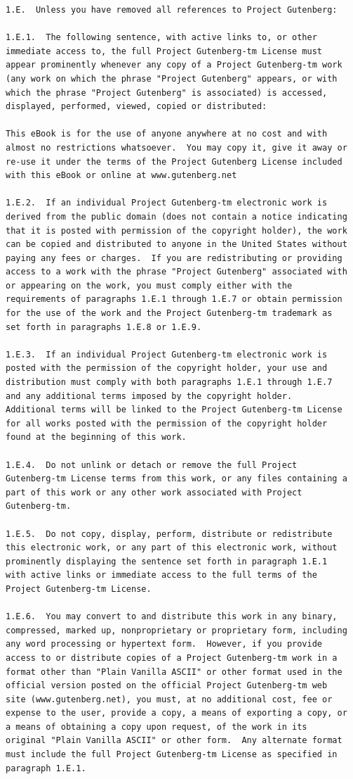 \documentclass[oneside]{book}
\begin{document}
\begin{verbatim}
1.E.  Unless you have removed all references to Project Gutenberg:

1.E.1.  The following sentence, with active links to, or other
immediate access to, the full Project Gutenberg-tm License must
appear prominently whenever any copy of a Project Gutenberg-tm work
(any work on which the phrase "Project Gutenberg" appears, or with
which the phrase "Project Gutenberg" is associated) is accessed,
displayed, performed, viewed, copied or distributed:

This eBook is for the use of anyone anywhere at no cost and with
almost no restrictions whatsoever.  You may copy it, give it away or
re-use it under the terms of the Project Gutenberg License included
with this eBook or online at www.gutenberg.net

1.E.2.  If an individual Project Gutenberg-tm electronic work is
derived from the public domain (does not contain a notice indicating
that it is posted with permission of the copyright holder), the work
can be copied and distributed to anyone in the United States without
paying any fees or charges.  If you are redistributing or providing
access to a work with the phrase "Project Gutenberg" associated with
or appearing on the work, you must comply either with the
requirements of paragraphs 1.E.1 through 1.E.7 or obtain permission
for the use of the work and the Project Gutenberg-tm trademark as
set forth in paragraphs 1.E.8 or 1.E.9.

1.E.3.  If an individual Project Gutenberg-tm electronic work is
posted with the permission of the copyright holder, your use and
distribution must comply with both paragraphs 1.E.1 through 1.E.7
and any additional terms imposed by the copyright holder.
Additional terms will be linked to the Project Gutenberg-tm License
for all works posted with the permission of the copyright holder
found at the beginning of this work.

1.E.4.  Do not unlink or detach or remove the full Project
Gutenberg-tm License terms from this work, or any files containing a
part of this work or any other work associated with Project
Gutenberg-tm.

1.E.5.  Do not copy, display, perform, distribute or redistribute
this electronic work, or any part of this electronic work, without
prominently displaying the sentence set forth in paragraph 1.E.1
with active links or immediate access to the full terms of the
Project Gutenberg-tm License.

1.E.6.  You may convert to and distribute this work in any binary,
compressed, marked up, nonproprietary or proprietary form, including
any word processing or hypertext form.  However, if you provide
access to or distribute copies of a Project Gutenberg-tm work in a
format other than "Plain Vanilla ASCII" or other format used in the
official version posted on the official Project Gutenberg-tm web
site (www.gutenberg.net), you must, at no additional cost, fee or
expense to the user, provide a copy, a means of exporting a copy, or
a means of obtaining a copy upon request, of the work in its
original "Plain Vanilla ASCII" or other form.  Any alternate format
must include the full Project Gutenberg-tm License as specified in
paragraph 1.E.1.


\end{verbatim}
\end{document}
